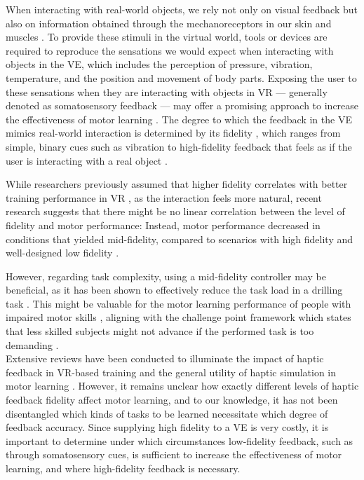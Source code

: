 \documentclass[conference]{IEEEtran}
\begin{document}
When interacting with real-world objects, we rely not only on visual feedback but also on information obtained through the mechanoreceptors in our skin and muscles \cite{Gonzalez-Grandon2021ProprioceptionInteraction}. To provide these stimuli in the virtual world, tools or devices are required to reproduce the sensations we would expect when interacting with objects in the VE, which includes the perception of pressure, vibration, temperature, and the position and movement of body parts. Exposing the user to these sensations when they are interacting with objects in VR --- generally denoted as somatosensory feedback --- may offer a promising approach to increase the effectiveness of motor learning \cite{Sainburg2022MovementNeurorehabilitation, Sigrist2013AugmentedReview}.
The degree to which the feedback in the VE mimics real-world interaction is determined by its fidelity \cite{Caird1996PersistentTraining}, which ranges from simple, binary cues such as vibration to high-fidelity feedback that feels as if the user is interacting with a real object \cite{Yang2023TheSimulation}.

While researchers previously assumed that higher fidelity correlates with better training performance in VR \cite{Caird1996PersistentTraining, Waller1998TheTraining}, as the interaction feels more natural, recent research suggests that there might be no linear correlation between the level of fidelity and motor performance: Instead, motor performance decreased in conditions that yielded mid-fidelity, compared to scenarios with high fidelity and well-designed low fidelity \cite{MahdiNabiyouni201520153DUI.}.

However, regarding task complexity, using a mid-fidelity controller may be beneficial, as it has been shown to effectively reduce the task load in a drilling task \cite{Yang2023TheSimulation}. This might be valuable for the motor learning performance of people with impaired motor skills \cite{Sigrist2013AugmentedReview}, aligning with the challenge point framework which states that less skilled subjects might not advance if the performed task is too demanding \cite{Guadagnoll2004ChallengeLearning}. \\

Extensive reviews have been conducted to illuminate the impact of haptic feedback in VR-based training \cite{Sigrist2013AugmentedReview} and the general utility of haptic simulation in motor learning \cite{Al-Saud2021TheReview}. However, it remains unclear how exactly different levels of haptic feedback fidelity affect motor learning, and to our knowledge, it has not been disentangled which kinds of tasks to be learned necessitate which degree of feedback accuracy.
Since supplying high fidelity to a VE is very costly, it is important to determine under which circumstances low-fidelity feedback, such as through somatosensory cues, is sufficient to increase the effectiveness of motor learning, and where high-fidelity feedback is necessary. 
\end{document}

